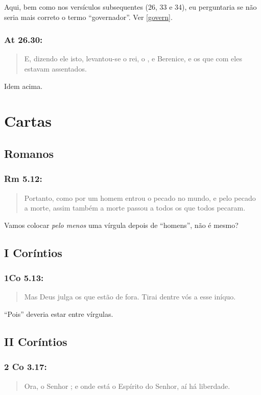 Aqui, bem como nos versículos subsequentes (26, 33 e 34), eu
perguntaria se não seria mais correto o termo ``governador''. Ver \ref{govern}.

\subsection*{At 26.30:}
\begin{quote}
    \small
E, dizendo ele isto, levantou-se o rei, o , e Berenice, e os que com eles estavam assentados.
\end{quote}
Idem acima.

\chapter{Cartas}
\section{Romanos}
\subsection*{Rm 5.12:}
\begin{quote}
    \small
Portanto, como por um homem entrou o pecado no mundo, e
 pelo pecado a morte, assim também a morte passou a todos os  que todos pecaram.
\end{quote}

Vamos colocar \emph{pelo menos} uma vírgula depois de ``homens'', não é mesmo?


\section{I Coríntios}
\subsection*{1Co 5.13:}
\begin{quote}
    \small
Mas Deus julga os que estão de fora. Tirai  dentre vós a esse iníquo.
\end{quote}

``Pois'' deveria estar entre vírgulas.

\section{II Coríntios}
\subsection*{2 Co 3.17:}
\begin{quote}
    \small
Ora, o Senhor ; e onde está o Espírito do
Senhor, aí há liberdade.
\end{quote}

